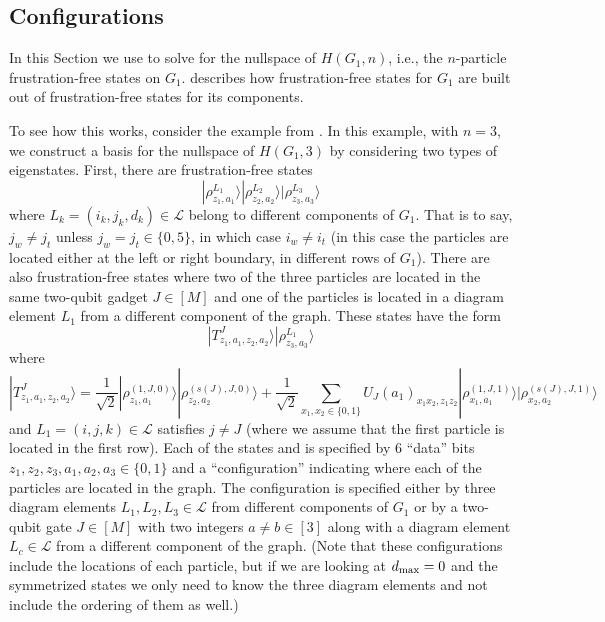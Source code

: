 \documentclass[../thesis-main/thesis-main]{subfiles}
\begin{document}
\subsection{Configurations}\label{sec:configurations}

In this Section we use  to solve for the nullspace of $H(G_{1},n)$, i.e., the $n$-particle frustration-free states on $G_{1}$.  describes how frustration-free states for $G_1$ are built out of frustration-free states for its components.

To see how this works, consider the example from . In this example, with $n=3$, we construct a basis for the nullspace of $H(G_{1},3)$ by considering two types of eigenstates. First, there are frustration-free states
\begin{equation}
  |\rho_{z_{1},a_{1}}^{L_{1}}\rangle|\rho_{z_{2},a_{2}}^{L_{2}}\rangle|\rho_{z_{3},a_{3}}^{L_{3}}\rangle
\label{eq:twopart_states1}
\end{equation}
where $L_{k}=(i_{k},j_{k},d_{k})\in\mathcal{L}$ belong to different components of $G_{1}$. That is to say, $j_{w}\neq j_{t}$ unless $j_{w}=j_{t}\in\{0,5\}$, in which case $i_{w}\neq i_{t}$ (in this case the particles are located either at the left or right boundary, in different rows of $G_{1}$). There are also frustration-free states where two of the three particles are located in the same two-qubit gadget $J\in[M]$ and one of the particles is located in a diagram element $L_{1}$ from a different component of the graph. These states have the form
\begin{equation}
  |T_{z_{1},a_{1},z_{2},a_{2}}^{J}\rangle|\rho_{z_{3},a_{3}}^{L_{1}}\rangle
\label{eq:twopart_states2}
\end{equation}
where 
\begin{equation}
|T_{z_{1},a_{1},z_{2},a_{2}}^{J}\rangle=\frac{1}{\sqrt{2}}|\rho_{z_{1},a_{1}}^{(1,J,0)}\rangle|\rho_{z_{2},a_{2}}^{(s(J),J,0)}\rangle+\frac{1}{\sqrt{2}}\sum_{x_{1},x_{2}\in\{0,1\}}U_{J}(a_{1})_{x_{1}x_{2},z_{1}z_{2}}|\rho_{x_{1},a_{1}}^{(1,J,1)}\rangle|\rho_{x_{2},a_{2}}^{(s(J),J,1)}\rangle\label{eq:T_state}
\end{equation}
and $L_{1}=(i,j,k)\in\mathcal{L}$ satisfies $j\neq J$ (where we assume that the first particle is located in the first row). Each of the states  and  is specified by $6$ ``data'' bits $z_{1},z_{2},z_{3},a_{1},a_{2},a_{3}\in\{0,1\}$ and a ``configuration'' indicating where each of the particles are located in the graph. The configuration is specified either by three diagram elements $L_{1},L_{2},L_{3}\in\mathcal{L}$ from different components of $G_{1}$ or by a two-qubit gate $J\in [M]$ with two integers $a\neq b\in[3]$ along with a diagram element $L_{c}\in\mathcal{L}$ from a different component of the graph.  (Note that these configurations include the locations of each particle, but if we are looking at $d_{\text{max}} = 0$ and the symmetrized states we only need to know the three diagram elements and not include the ordering of them as well.)
\end{document}
